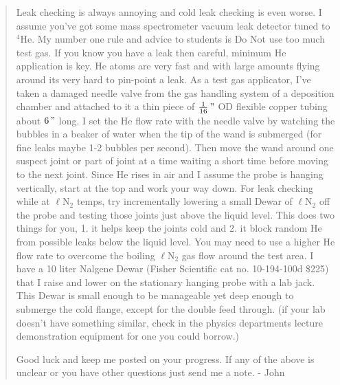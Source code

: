 \begin{quotation}
Leak checking is always annoying and cold leak checking is even worse.  I
assume you've got some mass spectrometer vacuum leak detector tuned to
$^4\mathrm{He}$.  
My number one rule and advice to students is Do Not use too much test
gas.  If you know you have a leak then careful, minimum He application is
key.  He atoms are very fast and with large amounts flying around its very
hard to pin-point a leak.  As a test gas applicator, I've taken a damaged
needle valve from the gas handling system of a deposition chamber and
attached to it a thin piece of $\frac{1}{16}\,\mbox{''}$ 
OD flexible copper tubing about $6\,\mbox{''}$ long.
I set the He flow rate with the needle valve by watching the bubbles in a
beaker of water when the tip of the wand is submerged (for fine leaks
maybe 1-2 bubbles per second).  Then move the wand around one suspect
joint or part of joint at a time waiting a short time before moving to the
next joint.  Since He rises in air and I assume the probe is hanging
vertically, start at the top and work your way down.  For leak checking
while at $\ell \mathrm{N}_2$ temps, try incrementally 
lowering a small Dewar of $\ell \mathrm{N}_2$ off the
probe and testing those joints just above the liquid level.  This does two
things for you, 1. it helps keep the joints cold and 2. it block random He
from possible leaks below the liquid level.  You may need to use a higher
He flow rate to overcome the boiling $\ell \mathrm{N}_2$ gas flow around 
the test area.  I
have a 10 liter Nalgene Dewar (Fisher Scientific cat no. 10-194-100d \$225)
that I raise and lower on the stationary hanging probe with a lab jack. 
This Dewar is small enough to be manageable yet deep enough to submerge the
cold flange, except for the double feed through.  (if your lab doesn't have
something similar, check in the physics departments lecture demonstration
equipment for one you could borrow.)

Good luck and keep me posted on your progress.  If any of the above is
unclear or you have other questions just send me a note. - John

\end{quotation}

\pagebreak



